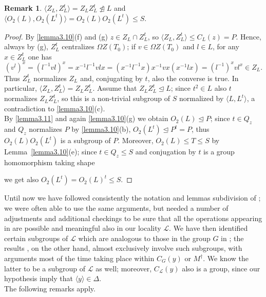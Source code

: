 \documentclass{amsart}
\numberwithin{equation}{section}
\theoremstyle{definition}
\newtheorem{remark}[equation]{Remark}
\theoremstyle{subresult}
\theoremstyle{caseresult}
\renewcommand{\L}{\mathcal{L}}
\newcommand{\norm}{\trianglelefteq}
\newcommand{\inv}{^{-1}}
\newcommand{\<}{\langle}
\renewcommand{\>}{\rangle}
\begin{document}
\begin{remark}\label{remark-to-3.10-3.14}
	$\<Z_L, Z_L^t \> =Z_L Z_L^t \not \norm L$ and $\<O_2(L),O_2(L^t) \> = O_2(L)O_2(L^t) \le S$.
\end{remark}
\begin{proof}
	By \ref{lemma3.10}(f) and (g) $z \in Z_L \cap Z_L^t$, so $\<Z_L, Z_L^t\> \le C_L(z) = P$. Hence, always by (g), $Z_L^t$ centralizes $\Omega Z(T_0)$; if $v \in \Omega Z(T_0)$ and $l \in L$, for any $x \in Z_L^t$ one has
	\[
	(v^l)^{x}=(l\inv v l)^{x} = x\inv l\inv v l x= (x\inv l\inv x) x\inv v x (x\inv l x) = (l\inv)^x v l^x \in Z_L.
	\]
	Thus $Z_L^t$ normalizes $Z_L$ and, conjugating by $t$, also the converse is true. In particular, $\<Z_L, Z_L^t \> =Z_L Z_L^t$. Assume that $Z_L Z_L^t \norm L$; since $t^2 \in L$ also $t$ normalizes $Z_LZ_L^t$, so this is a non-trivial subgroup of $S$ normalized by $\<L,L^t\>$, a contradiction to \ref{lemma3.10}(c).\\
	By \ref{lemma3.11} and again \ref{lemma3.10}(g) we obtain $O_2(L) \norm P$; since $t \in Q_z$ and $Q_z$ normalizes $P$ by \ref{lemma3.10}(b), $O_2(L^t) \norm P^t = P$, thus $O_2(L)O_2(L^t)$ is a subgroup of $P$. Moreover, $O_2(L) \le T \le S$ by Lemma~\ref{lemma3.10}(e); since $t \in Q_z \le S$ and conjugation by $t$ is a group homomorphism taking shape
	\begin{center}
	\end{center}
	we get also $O_2(L^t) = O_2(L)^t \le S$.
\end{proof}


Until now we have followed consistently the notation and lemmas subdivision of \cite[Chapter 3]{Meier-Stell-Stroth:2012}; we were often able to use the same arguments, but needed a number of adjustments and additional checkings to be sure that all the operations appearing in \cite{Meier-Stell-Stroth:2012} are possible and meaningful also in our locality $\L$. We have then identified certain subgroups of $\L$ which are analogous to those in the group $G$ in \cite{Meier-Stell-Stroth:2012}; the results \cite[Lemma 3.12 to 3.27]{Meier-Stell-Stroth:2012}, on the other hand, almost exclusively involve such subgroups, with arguments most of the time taking place within $C_G(y)$ or $M^\dagger$. We know the latter to be a subgroup of $\L$ as well; moreover, $C_\L(y)$ also is a group, since our hypothesis imply that $\< y \> \in \Delta$.\\
The following remarks apply.
\end{document}

